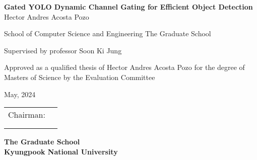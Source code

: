 \begin{titlepage}
    \begin{center}
        \textbf{\huge Gated YOLO Dynamic Channel Gating for Efficient Object Detection \newline}  
        \textnormal{\Large Hector Andres Acosta Pozo}
        
        
        \textnormal{\large School of Computer Science and Engineering\newline}
        \textnormal{\large The Graduate School} 
        
        \textnormal{\large Supervised by professor Soon Ki Jung}
        
        \textnormal{\large Approved as a qualified thesis of Hector Andres Acosta Pozo \newline }
        \textnormal{\large for the degree of Masters of Science\newline}
        \textnormal{\large by the Evaluation Committee \newline}
        
        \textnormal{\large May, 2024}
        
        \begin{flushright}
        	\begin{tabular}{cl}
            \textnormal{Chairman}:	    & \underline{\makebox[2in][l]{Prof. Koh Seok-ju}}\\ 
             							& \underline{\makebox[2in][l]{Prof. Jung Soon-ki}}\\  
             							& \underline{\makebox[2in][l]{Prof. Kim Yong-tae}}\\ 
                                                                                
            \end{tabular}
        \end{flushright}
        \vfill 
        
       \textbf{\Large The Graduate School \\ Kyungpook National University}
        \vfill               
    \end{center}
\end{titlepage}